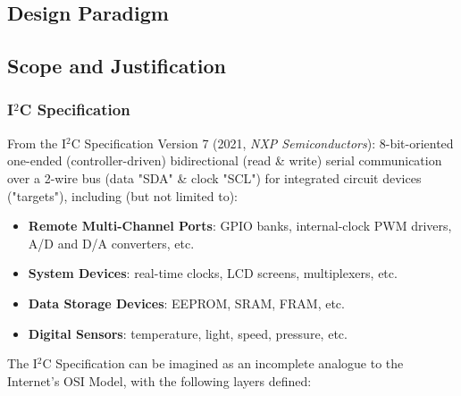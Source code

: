 \documentclass{../tex/report}
\begin{document}


\clearpage

\subsection{Design Paradigm}\label{sec:structure}



\clearpage


\subsection{Scope and Justification}\label{sec:scope}

\subsubsection{I${}^2$C Specification}

\hspace{24pt} From the I${}^2$C Specification Version 7 (2021, \textit{NXP Semiconductors}): 8-bit-oriented one-ended (controller-driven) bidirectional (read \& write) serial communication over a 2-wire bus (data "SDA" \& clock "SCL") for integrated circuit devices ("targets"), including (but not limited to):

\begin{itemize}
    \item \textbf{Remote Multi-Channel Ports}: GPIO banks, internal-clock PWM drivers, A/D and D/A converters, etc.
    \item \textbf{System Devices}: real-time clocks, LCD screens, multiplexers, etc.
    \item \textbf{Data Storage Devices}: EEPROM, SRAM, FRAM, etc.
    \item \textbf{Digital Sensors}: temperature, light, speed, pressure, etc.
\end{itemize}

\hspace{24pt} The I${}^2$C Specification can be imagined as an incomplete analogue to the Internet's OSI Model, with the following layers defined:
\end{document}
